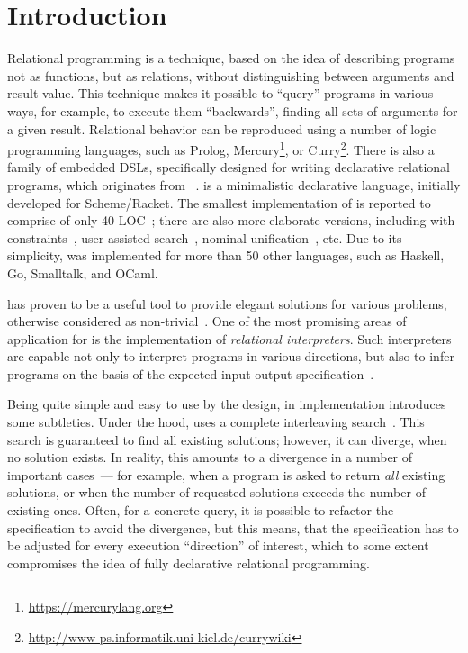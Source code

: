 \section{Introduction}

Relational programming is a technique, based on the idea of describing programs not as functions, but 
as relations, without distinguishing between arguments and result value. This technique makes it 
possible to ``query'' programs in various ways, for example, to execute them ``backwards'', finding
all sets of arguments for a given result. Relational behavior can be reproduced using a number of
logic programming languages, such as Prolog, Mercury\footnote{\url{https://mercurylang.org}}, 
or Curry\footnote{\url{http://www-ps.informatik.uni-kiel.de/currywiki}}. 
There is also a family of embedded DSLs, specifically designed for writing declarative relational
programs, which originates from \miniKanren~\cite{TRS}. \miniKanren is a minimalistic 
declarative language, initially developed for Scheme/Racket. The smallest implementation of \miniKanren 
is reported to comprise of only 40 LOC~\cite{MicroKanren,2016}; there are also more elaborate versions, including
\miniKanren with constraints~\cite{CKanren,CKanren1}, user-assisted search~\cite{Guided}, nominal unification~\cite{AlphaKanren},
etc. Due to its simplicity, \miniKanren was implemented for more than 50 other languages, such as
Haskell, Go, Smalltalk, and OCaml.

\miniKanren has proven to be a useful tool to provide elegant solutions for various problems, otherwise considered as
non-trivial~\cite{WillThesis}. One of the most promising areas of application for \miniKanren is the implementation of
\emph{relational interpreters}. Such interpreters are capable not only to interpret programs in various directions, but also
to infer programs on the basis of the expected input-output specification~\cite{Untagged}.

Being quite simple and easy to use by the design, in implementation \miniKanren introduces some subtleties. Under the hood, \miniKanren 
uses a complete interleaving search~\cite{Search}. This search is guaranteed to find all existing solutions; however, it can diverge, when no 
solution exists. In reality, this amounts to a divergence in a number of important cases~--- for example, when a program is asked to 
return \emph{all} existing solutions, or when the number of requested solutions exceeds the number of existing ones. Often, for a 
concrete query, it is possible to refactor the specification to avoid the divergence, but this means, that the specification has to be adjusted for every 
execution ``direction'' of interest, which to some extent compromises the idea of fully declarative relational programming. 

